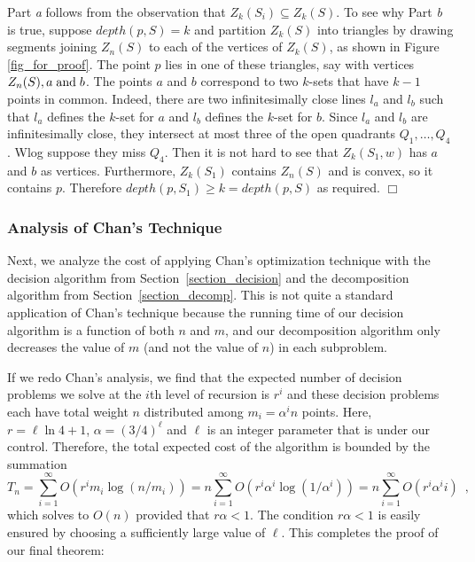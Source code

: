 \documentclass{elsart}
\newenvironment{proof}{{\bf Proof:} \rm}{\hfill $\Box$ \medskip\\}
\begin{document}
\begin{proof} Part \textit{a} follows from the observation that
$Z_k(S_i) \subseteq Z_k(S)$. To see why Part \textit{b} is true,
suppose $depth(p,S) = k$ and partition $Z_k(S)$ into triangles by
drawing segments joining $Z_n(S)$ to each of the vertices of $Z_k(S)$,
as shown in Figure \ref{fig_for_proof}. The point $p$ lies in one of
these triangles, say with vertices $Z_n(S), a \hspace{1mm} \mbox{and}
\hspace{1mm} b$. The points $a$ and $b$ correspond to two $k$-sets
that have $k-1$ points in common. Indeed, there are two
infinitesimally close lines $l_a$ and $l_b$ such that $l_a$ defines
the $k$-set for $a$ and $l_b$ defines the $k$-set for $b$. Since $l_a$
and $l_b$ are infinitesimally close, they intersect at most three of
the open quadrants $Q_1, \ldots, Q_4$. Wlog suppose they miss $Q_4$. Then
it is not hard to see that $Z_k(S_1,w)$ has $a$ and $b$ as vertices.
Furthermore, $Z_k(S_1)$ contains $Z_n(S)$ and is convex, so it
contains $p$. Therefore $depth(p,S_1) \ge k = depth(p,S)$ as required.
\end{proof}

\subsubsection{Analysis of Chan's Technique}

Next, we analyze the cost of applying Chan's optimization technique
with the decision algorithm from Section~\ref{section_decision} and
the decomposition algorithm from Section~\ref{section_decomp}.  This
is not quite a standard application of Chan's technique because the
running time of our decision algorithm is a function of both $n$ and
$m$, and our decomposition algorithm only decreases the value of $m$
(and not the value of $n$) in each subproblem. 

If we redo Chan's analysis, we find that the expected number of
decision problems we solve at the $i$th level of recursion is $r^i$
and these decision problems each have total weight $n$ distributed
among $m_i=\alpha^i n$ points.  Here, $r=\ell\ln4+1$,
$\alpha=(3/4)^\ell$ and $\ell$ is an integer parameter that is under
our control.  Therefore, the total expected cost of the algorithm is
bounded by the summation
\[
   T_n = \sum_{i=1}^\infty O\left(r^im_i\log (n/m_i)\right)
   = n\sum_{i=1}^\infty O\left(r^i\alpha^i \log(1/\alpha^i)\right)
   = n\sum_{i=1}^\infty O\left(r^i\alpha^i i\right) \enspace ,
\]
which solves to $O(n)$ provided that $r\alpha < 1$.  The condition
$r\alpha < 1$ is easily ensured by choosing a sufficiently large
value of $\ell$.  This completes the proof of our final theorem:
\end{document}
